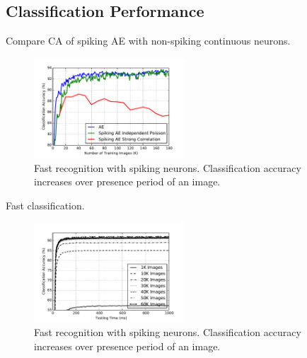 \documentclass{article}
\begin{document}
\subsection{Classification Performance}
Compare CA of spiking AE with non-spiking continuous neurons. 
\begin{figure}
	\centering
	\includegraphics[width=0.5\textwidth]{recog_comp}
	\caption{Fast recognition with spiking neurons. Classification accuracy increases over presence period of an image.}
	\label{fig:recog_comp}		
\end{figure}

Fast classification.
\begin{figure}
	\centering
	\includegraphics[width=0.5\textwidth]{recog_speed}
	\caption{Fast recognition with spiking neurons. Classification accuracy increases over presence period of an image.}
	\label{fig:recog_speed}		
\end{figure}


%
%
\end{document}
